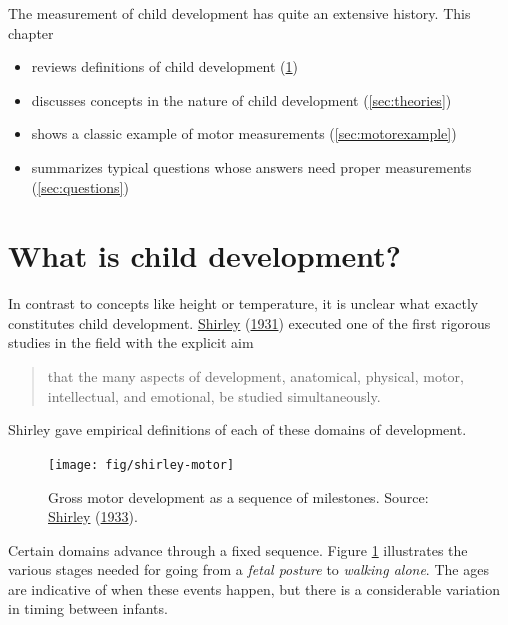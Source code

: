 \documentclass[
]{book}
\providecommand{\tightlist}{%
  \setlength{\itemsep}{0pt}\setlength{\parskip}{0pt}}
\begin{document}
The measurement of child development has quite an extensive history. This chapter

\begin{itemize}
\tightlist
\item
  reviews definitions of child development (\ref{sec:definitions})
\item
  discusses concepts in the nature of child development (\ref{sec:theories})
\item
  shows a classic example of motor measurements (\ref{sec:motorexample})
\item
  summarizes typical questions whose answers need proper measurements (\ref{sec:questions})
\end{itemize}

\hypertarget{sec:definitions}{%
\section{What is child development?}\label{sec:definitions}}

In contrast to concepts like height or temperature, it is unclear what exactly constitutes child development. \protect\hyperlink{ref-shirley1931}{Shirley} (\protect\hyperlink{ref-shirley1931}{1931}) executed one of the first rigorous studies in the field with the explicit aim

\begin{quote}
that the many aspects of development, anatomical, physical, motor, intellectual, and emotional, be studied simultaneously.
\end{quote}

Shirley gave empirical definitions of each of these domains of development.

\begin{figure}

{\centering \texttt{[image: fig/shirley-motor]} 

}

\caption{Gross motor development as a sequence of milestones. Source: \protect\hyperlink{ref-shirley1933}{Shirley} (\protect\hyperlink{ref-shirley1933}{1933}).}\label{fig:shirleyplot}
\end{figure}



Certain domains advance through a fixed sequence. Figure \ref{fig:shirleyplot} illustrates the various stages needed for going from a \emph{fetal posture} to \emph{walking alone}. The ages are indicative of when these events happen, but there is a considerable variation in timing between infants.
\end{document}
